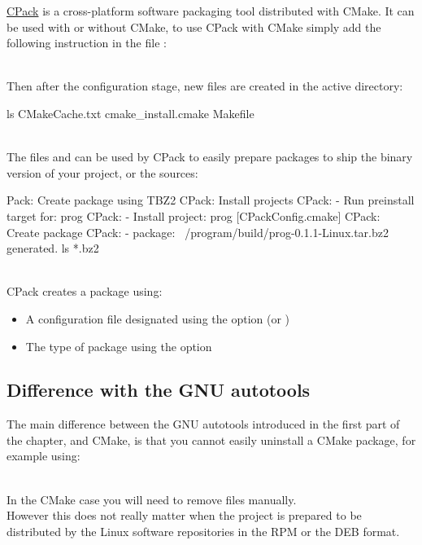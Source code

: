 \href{https://cmake.org/cmake/help/book/mastering-cmake/chapter/Packaging\%20With\%20CPack.html}{CPack} is a cross-platform software packaging tool distributed with CMake. 
It can be used with or without CMake, to use CPack with CMake simply add the following instruction in the file :
\begin{script}
\end{script}
\\[-0.5cm]
\noindent Then after the configuration stage, new files are created in the active directory: 
\begin{script}
 ls 
CMakeCache.txt                         cmake\_install.cmake  
    Makefile
\end{script}\\[-0.5cm]
The files  and  can be used by CPack to easily prepare packages to ship the binary version of your project, or the sources: 
\begin{script}
     
Pack: Create package using TBZ2
CPack: Install projects
CPack: - Run preinstall target for: prog
CPack: - Install project: prog [CPackConfig.cmake]
CPack: Create package
CPack: - package: ~/program/build/prog-0.1.1-Linux.tar.bz2 generated.
 ls *.bz2
\end{script}
\\[-0.5cm]
CPack creates a package using: 
\begin{itemize}
\item A configuration file designated using the option  (or )
\item The type of package using the option 
\end{itemize}

\subsection{Difference with the GNU autotools}

The main difference between the GNU autotools introduced in the first part of the chapter, and CMake, 
is that you cannot easily uninstall a CMake package, for example using: 
\begin{script}
	   
\end{script}
\\[-0.5cm]
In the CMake case you will need to remove files manually. \\[0.25cm]
However this does not really matter when the project is prepared to be distributed by the Linux software repositories in the RPM or the DEB format. 

